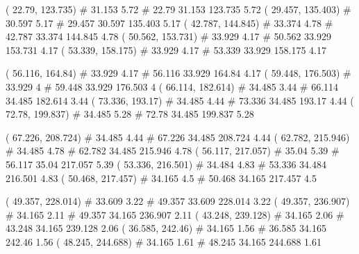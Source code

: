 \documentclass[a4paper,openbib,10pt]{article}
\newenvironment{treegraph}{\begin{graph}}{\end{graph}}
\begin{document}
\begin{treegraph}
  ( 22.79, 123.735) #     31.153    5.72
   #    22.79    31.153    123.735    5.72
  ( 29.457, 135.403) #     30.597    5.17
   #    29.457    30.597    135.403    5.17
  ( 42.787, 144.845) #     33.374    4.78
   #    42.787    33.374    144.845    4.78
  ( 50.562, 153.731) #     33.929    4.17
   #    50.562    33.929    153.731    4.17
  ( 53.339, 158.175) #     33.929    4.17
   #    53.339    33.929    158.175    4.17

  ( 56.116, 164.84) #     33.929    4.17
   #    56.116    33.929    164.84    4.17
  ( 59.448, 176.503) #     33.929    4
   #    59.448    33.929    176.503    4
  ( 66.114, 182.614) #     34.485    3.44
   #    66.114    34.485    182.614    3.44
  ( 73.336, 193.17) #     34.485    4.44
   #    73.336    34.485    193.17    4.44
  ( 72.78, 199.837) #     34.485    5.28
   #    72.78    34.485    199.837    5.28

  ( 67.226, 208.724) #     34.485    4.44
   #    67.226    34.485    208.724    4.44
  ( 62.782, 215.946) #     34.485    4.78
   #    62.782    34.485    215.946    4.78
  ( 56.117, 217.057) #     35.04    5.39
   #    56.117    35.04    217.057    5.39
  ( 53.336, 216.501) #     34.484    4.83
   #    53.336    34.484    216.501    4.83
  ( 50.468, 217.457) #     34.165    4.5
   #    50.468    34.165    217.457    4.5

  ( 49.357, 228.014) #     33.609    3.22
   #    49.357    33.609    228.014    3.22
  ( 49.357, 236.907) #     34.165    2.11
   #    49.357    34.165    236.907    2.11
  ( 43.248, 239.128) #     34.165    2.06
   #    43.248    34.165    239.128    2.06
  ( 36.585, 242.46) #     34.165    1.56
   #    36.585    34.165    242.46    1.56
  ( 48.245, 244.688) #     34.165    1.61
   #    48.245    34.165    244.688    1.61


\end{treegraph}
\end{document}
